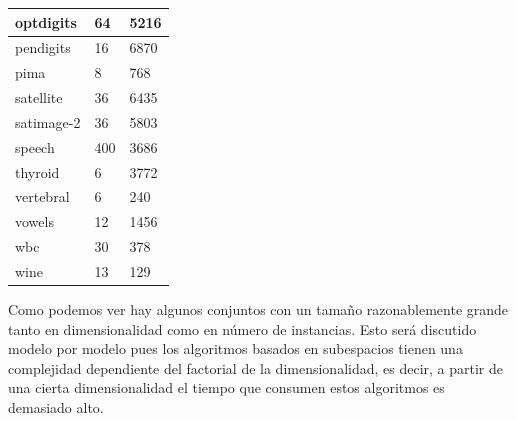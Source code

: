 \begin{table}[H]
\begin{tabular}{|l|l|l|}
		optdigits                                   & 64                                                  & 5216                                                     \\ \hline
		pendigits                                   & 16                                                  & 6870                                                     \\ \hline
		pima                                        & 8                                                   & 768                                                      \\ \hline
		satellite                                   & 36                                                  & 6435                                                     \\ \hline
		satimage-2                                  & 36                                                  & 5803                                                     \\ \hline
		speech                                      & 400                                                 & 3686                                                     \\ \hline
		thyroid                                     & 6                                                   & 3772                                                     \\ \hline
		vertebral                                   & 6                                                   & 240                                                      \\ \hline
		vowels                                      & 12                                                  & 1456                                                     \\ \hline
		wbc                                         & 30                                                  & 378                                                      \\ \hline
		wine                                        & 13                                                  & 129                                                      \\ \hline
	\end{tabular}
\end{table}

Como podemos ver hay algunos conjuntos con un tamaño razonablemente grande tanto en dimensionalidad como en número de instancias. Esto será discutido modelo por modelo pues los algoritmos basados en subespacios tienen una complejidad dependiente del factorial de la dimensionalidad, es decir, a partir de una cierta dimensionalidad el tiempo que consumen estos algoritmos es demasiado alto.
